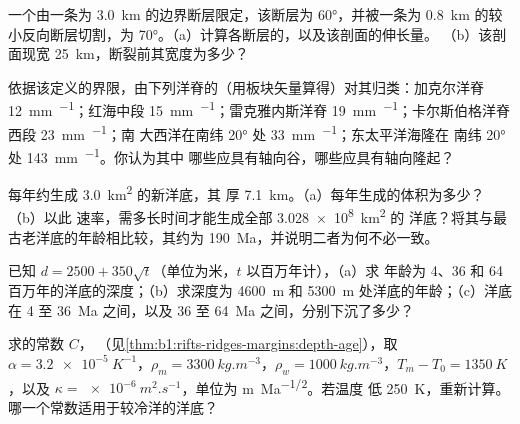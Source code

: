 \begin{exercise}[$\star$]\label{exo:b1:rifts-ridges-margins:2}
一个由一条为 \qty{3.0}{km} 的边界断层限定，该断层为
\ang{60}，并被一条为 \qty{0.8}{km} 的较小反向断层切割，为
\ang{70}。（a）计算各断层的，以及该剖面的伸长量。
（b）该剖面现宽 \qty{25}{km}，断裂前其宽度为多少？
\end{exercise}

\begin{exercise}[$\star$]\label{exo:b1:rifts-ridges-margins:3}
依据该定义的界限，由下列洋脊的（用板块矢量算得）对其归类：加克尔洋脊
\qty{12}{mm.^{-1}}；红海中段 \qty{15}{mm.^{-1}}；雷克雅内斯洋脊
\qty{19}{mm.^{-1}}；卡尔斯伯格洋脊西段 \qty{23}{mm.^{-1}}；南
大西洋在南纬 \ang{20} 处 \qty{33}{mm.^{-1}}；东太平洋海隆在
南纬 \ang{20} 处 \qty{143}{mm.^{-1}}。你认为其中
哪些应具有轴向谷，哪些应具有轴向隆起？
\end{exercise}

\begin{exercise}[$\star$]\label{exo:b1:rifts-ridges-margins:4}
每年约生成 \qty{3.0}{km^2} 的新洋底，其
厚 \qty{7.1}{km}。（a）每年生成的体积为多少？（b）以此
速率，需多长时间才能生成全部 \qty{3.028e8}{km^2} 的
洋底？将其与最古老洋底的年龄相比较，其约为
\qty{190}{Ma}，并说明二者为何不必一致。
\end{exercise}

\begin{exercise}[$\star\star$]\label{exo:b1:rifts-ridges-margins:5}
已知 $d = 2500 + 350\sqrt t$（单位为米，$t$ 以百万年计），（a）求
年龄为 4、36 和 64 百万年的洋底的深度；（b）求深度为
\qty{4600}{m} 和 \qty{5300}{m} 处洋底的年龄；（c）洋底在
4 至 \qty{36}{Ma} 之间，以及 36 至 \qty{64}{Ma} 之间，分别下沉了多少？
\end{exercise}

\begin{exercise}[$\star\star$]\label{exo:b1:rifts-ridges-margins:6}
求的常数 $C$，
（见\cref{thm:b1:rifts-ridges-margins:depth-age}），取 $\alpha =
\qty{3.2e-5}{K^{-1}}$，$\rho_m = \qty{3300}{kg.m^{-3}}$，$\rho_w =
\qty{1000}{kg.m^{-3}}$，$T_m - T_0 = \qty{1350}{K}$，以及 $\kappa =
\qty{e-6}{m^2.s^{-1}}$，单位为 \unit{m.Ma^{-1/2}}。若温度
低 \qty{250}{K}，重新计算。哪一个常数适用于较冷洋的洋底？
\end{exercise}

